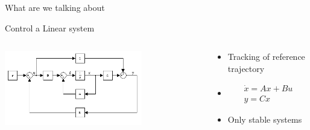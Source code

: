 \documentclass[17pt, t, lualatex]{beamer}
\begin{document}
\begin{frame}{What are we talking about}
	\begin{block}{Control a Linear system}
		\begin{columns}[T]
			\begin{column}{0.48\textwidth}
				\begin{center}
					\includegraphics[width=0.7\textwidth]{figures/closed_loop_control.png}
				\end{center}

			\end{column}

			\begin{column}{0.48\textwidth}
				\begin{itemize}
					\item Tracking of reference trajectory
					\item[] \begin{equation}\begin{aligned}
						\dot{x} = Ax + Bu\\
						y = Cx
						\end{aligned}\end{equation}
					\item Only stable systems
				\end{itemize}
			\end{column}
		\end{columns}
	\end{block}
\end{frame}
\end{document}
